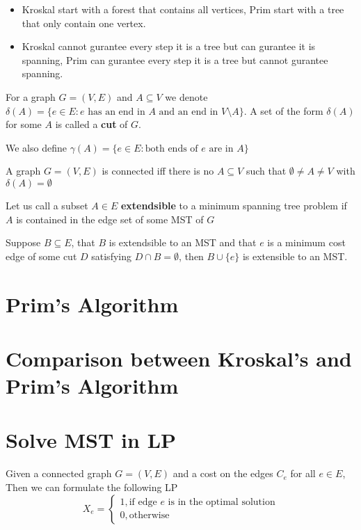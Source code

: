 			\begin{itemize}
				\item Kroskal start with a forest that contains all vertices, Prim start with a tree that only contain one vertex.
				\item Kroskal cannot gurantee every step it is a tree but can gurantee it is spanning, Prim can gurantee every step it is a tree but cannot gurantee spanning.
			\end{itemize}

			\begin{definition}[cut]
				For a graph $G=(V, E)$ and $A \subseteq V$ we denote $\delta(A) = \{e \in E :\text{$e$ has an end in $A$ and an end in $V\setminus A$}\}$. A set of the form $\delta(A)$ for some $A$ is called a \textbf{cut} of $G$.
			\end{definition}

			\begin{definition}
				We also define $\gamma(A) = \{e\in E: \text{both ends of $e$ are in $A$}\}$				
			\end{definition}

			\begin{theorem}
				A graph $G=(V, E)$ is connected iff there is no $A\subseteq V$ such that $\emptyset \ne A \ne V$ with $\delta(A) = \emptyset$
			\end{theorem}

			\begin{definition}
				Let us call a subset $A \in E$ \textbf{extendsible} to a minimum spanning tree problem if $A$ is contained in the edge set of some MST of $G$
			\end{definition}

			\begin{theorem}
				Suppose $B \subseteq E$, that $B$ is extendsible to an MST and that $e$ is a minimum cost edge of some cut $D$ satisfying $D\cap B = \emptyset$, then $B\cup \{e\}$ is extensible to an MST.
			\end{theorem}

		\section{Prim's Algorithm}

		\section{Comparison between Kroskal's and Prim's Algorithm}

		\section{Solve MST in LP}
			Given a connected graph $G=(V, E)$ and a cost on the edges $C_e$ for all $e\in E$, Then we can formulate the following LP
			\begin{equation}
				X_e = \begin{cases}
					1, \text{if edge $e$ is in the optimal solution} \\
					0, \text{otherwise}
				\end{cases}
			\end{equation}

